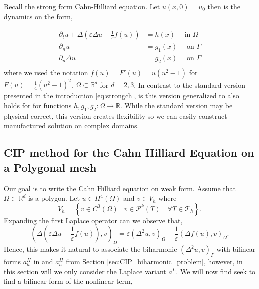 Recall the strong form Cahn-Hilliard equation. Let $ u( x,0) =  u_{0}$ then is the dynamics on the form,

\begin{equation}
\label{eq:ch_gen}
    \begin{split}
\partial _{t} u + \Delta  \left(  \varepsilon  \Delta u - \frac{1}{\varepsilon }f( u) \right)   &= h( x)   \quad \text{ in } \Omega  \\
\partial _{n} u &= g_{1}( x)  \quad \text{ on } \Gamma  \\
\partial _{n}    \Delta u   &= g_{2}(x)  \quad \text{ on } \Gamma  \\
    \end{split}
\end{equation}
where we used the notation $f( u) = F'( u) =u( u^2 -1)  $ for $F( u) = \frac{1}{4}( u^{2} - 1)^{2} $. $\Omega \subset \mathbb{R} ^{d} $  for $d = 2,3$. In contrast to the standard version presented in the introduction \eqref{eq:strongch}, is this version
generalized to also holds for for functions $h,g_{1},g_{2}: \Omega \to\mathbb{R}   $. While the standard version may be physical correct, this version creates flexibility so we can easily construct manufactured solution on complex domains.



\subsection{ CIP method for the Cahn Hilliard Equation on a Polygonal mesh}%
\label{sub:writing_the_cahn_hilliard_equation_of_weak_form}

Our goal is to write the Cahn Hilliard equation on weak form.
Assume that $\Omega  \subset \mathbb{R} ^{d}$ is a polygon.
 Let $u \in  H^{4}( \Omega ) $ and $v \in V_{h} $ where
\[
V_{h} = \left\{ v \in C^{0}( \Omega )   \mid v\in \mathcal{P} ^{k} ( T) \quad \forall T \in \mathcal{T} _{h} \right\}.
\]
Expanding the first Laplace operator can we observe that,
\[
 ( \Delta ( \varepsilon  \Delta u - \frac{1}{\varepsilon } f( u) ) ,v )_{\Omega } = \varepsilon ( \Delta^{2} u ,v )_{\Omega } - \frac{1}{\varepsilon } ( \Delta f( u)  ,v )_{\Omega }.
\]
Hence, this makes it natural to associate the biharmonic $( \Delta ^2 u,v)_{\Gamma } $ with bilinear forms $a_h^{H} $ in  and $a^{H}_{h} $ from Section \ref{sec:CIP_biharmonic_problem}, however, in this section will we only consider the Laplace
variant $a^{L}$.
We will now find seek to find a bilinear form of the nonlinear term,

